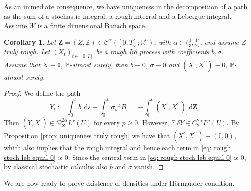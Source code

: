 \documentclass[11pt,a4paper]{article}
\newcommand{\R}{\mathbb{R}}
\theoremstyle{plain}
\newtheorem{coroll}[defn]{Corollary}
\begin{document}
As an immediate consequence, we have uniqueness in the decomposition of a path as the sum of a stochastic integral, a rough integral and a Lebesgue integral. Assume $W$ is a finite dimensional Banach space.

\begin{coroll}
\label{cor: weak norris}
     Let $\mathbf{Z}=(Z,\mathbb{Z}) \in \mathscr{C}^{\alpha}([0,T];\R^n)$, with $\alpha \in (\frac{1}{3},\frac{1}{2}]$, and assume $Z$ truly rough. Let $(X_t)_{t\in[0,T]}$ be a rough It\^o process with coefficients $b,\sigma$. Assume that $X \equiv 0$, $\mathbb{P}$-almost surely, then 
     $b\equiv 0$, $\sigma \equiv 0$ and $(X^{\prime},X^{\prime\prime}) \equiv 0$, $\mathbb{P}$-almost surely.
     
\end{coroll}
\begin{proof}
    We define the path
    \begin{equation}
    \label{eq: rough stoch leb equal 0}
        Y_t :=
        \int_0^t b_s \mathrm{d}s
         + \int_0^t \sigma_s \mathrm{d} B_s
         = -\int_0^t (X^{\prime},X^{\prime\prime})_s \mathrm{d}\mathbf{Z}_s.
    \end{equation}
    Then $(Y,X^{\prime}) \in \mathscr{D}_{\mathbf{Z}}^{2\alpha}L^{p}(U)$ for every $p\geq 0$. However, $\mathbb{E}_{\cdot}\delta Y\in C^{2\alpha}_2L^p(U)$. By Proposition \ref{prop: uniqueness truly rough} we have that $(X^{\prime},X^{\prime\prime}) \equiv (0,0)$, which also implies that the rough integral and hence each term in \eqref{eq: rough stoch leb equal 0} is $0$. Since the central term in \eqref{eq: rough stoch leb equal 0} is $0$, by classical stochastic calculus also $b$ and $\sigma$ vanish.
\end{proof}

We are now ready to prove existence of densities under Hörmander condition. 
\end{document}
